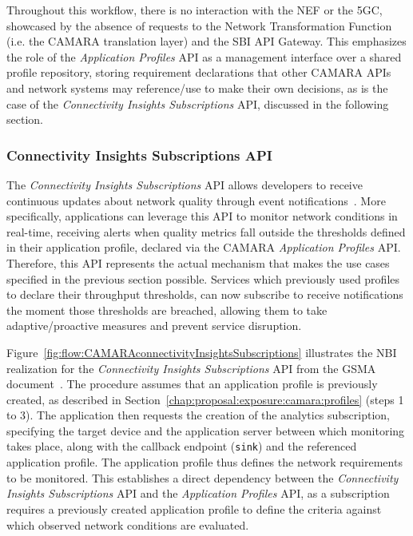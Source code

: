 Throughout this workflow, there is no interaction with the \acs{NEF} or the \acs{5GC}, showcased by the absence of requests to the Network Transformation Function (i.e. the CAMARA translation layer) and the \acs{SBI} \acs{API} Gateway. This emphasizes the role of the \textit{Application Profiles} \acs{API} as a management interface over a shared profile repository, storing requirement declarations that other CAMARA \acsp{API} and network systems may reference/use to make their own decisions, as is the case of the \textit{Connectivity Insights Subscriptions} \acs{API}, discussed in the following section.

\subsubsection{Connectivity Insights Subscriptions \acs{API}}
\label{chap:proposal:exposure:camara:insights}

The \textit{Connectivity Insights Subscriptions} \acs{API} allows developers to receive continuous updates about network quality through event notifications~\cite{CAMARAConnectivityInsightsSubscriptions}. More specifically, applications can leverage this \acs{API} to monitor network conditions in real-time, receiving alerts when quality metrics fall outside the thresholds defined in their application profile, declared via the CAMARA \textit{Application Profiles} \acs{API}. Therefore, this \acs{API} represents the actual mechanism that makes the use cases specified in the previous section possible. Services which previously used profiles to declare their throughput thresholds, can now subscribe to receive notifications the moment those thresholds are breached, allowing them to take adaptive/proactive measures and prevent service disruption.

Figure~\ref{fig:flow:CAMARAconnectivityInsightsSubscriptions} illustrates the \acs{NBI} realization for the \textit{Connectivity Insights Subscriptions} \acs{API} from the \acs{GSMA} document~\cite{gsmaNbiRealization}. The procedure assumes that an application profile is previously created, as described in Section~\ref{chap:proposal:exposure:camara:profiles} (steps 1 to 3). The application then requests the creation of the analytics subscription, specifying the target device and the application server between which monitoring takes place, along with the callback endpoint (\texttt{sink}) and the referenced application profile. The application profile thus defines the network requirements to be monitored. This establishes a direct dependency between the \textit{Connectivity Insights Subscriptions} \acs{API} and the \textit{Application Profiles} \acs{API}, as a subscription requires a previously created application profile to define the criteria against which observed network conditions are evaluated.

